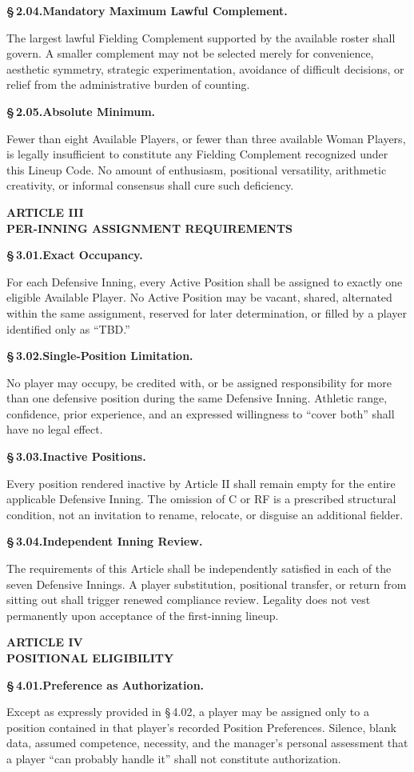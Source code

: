 \documentclass[11pt]{article}
\newcommand{\articleheading}[1]{%
  \vspace{6pt}
  \begin{center}
    \large\bfseries #1
  \end{center}
  \vspace{-3pt}
}
\newcommand{\sectionheading}[2]{%
  \vspace{4pt}
  \noindent\textbf{\S\,#1.\quad #2}\par
}
\begin{document}
\sectionheading{2.04}{Mandatory Maximum Lawful Complement.}
The largest lawful Fielding Complement supported by the available roster shall
govern. A smaller complement may not be selected merely for convenience,
aesthetic symmetry, strategic experimentation, avoidance of difficult
decisions, or relief from the administrative burden of counting.

\sectionheading{2.05}{Absolute Minimum.}
Fewer than eight Available Players, or fewer than three available Woman
Players, is legally insufficient to constitute any Fielding Complement
recognized under this Lineup Code. No amount of enthusiasm, positional
versatility, arithmetic creativity, or informal consensus shall cure such
deficiency.

\articleheading{ARTICLE III\\PER-INNING ASSIGNMENT REQUIREMENTS}

\sectionheading{3.01}{Exact Occupancy.}
For each Defensive Inning, every Active Position shall be assigned to exactly
one eligible Available Player. No Active Position may be vacant, shared,
alternated within the same assignment, reserved for later determination, or
filled by a player identified only as ``TBD.''

\sectionheading{3.02}{Single-Position Limitation.}
No player may occupy, be credited with, or be assigned responsibility for more
than one defensive position during the same Defensive Inning. Athletic range,
confidence, prior experience, and an expressed willingness to ``cover both''
shall have no legal effect.

\sectionheading{3.03}{Inactive Positions.}
Every position rendered inactive by Article II shall remain empty for the
entire applicable Defensive Inning. The omission of C or RF is a prescribed
structural condition, not an invitation to rename, relocate, or disguise an
additional fielder.

\sectionheading{3.04}{Independent Inning Review.}
The requirements of this Article shall be independently satisfied in each of
the seven Defensive Innings. A player substitution, positional transfer, or
return from sitting out shall trigger renewed compliance review. Legality does
not vest permanently upon acceptance of the first-inning lineup.

\articleheading{ARTICLE IV\\POSITIONAL ELIGIBILITY}

\sectionheading{4.01}{Preference as Authorization.}
Except as expressly provided in \S\,4.02, a player may be assigned only to a
position contained in that player's recorded Position Preferences. Silence,
blank data, assumed competence, necessity, and the manager's personal
assessment that a player ``can probably handle it'' shall not constitute
authorization.
\end{document}
